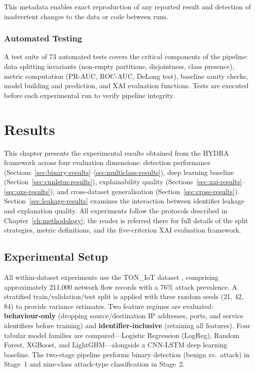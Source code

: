 \documentclass[12pt,a4paper]{report}
\begin{document}
This metadata enables exact reproduction of any reported result and detection of inadvertent changes to the data or code between runs.

\subsection{Automated Testing}
\label{sec:testing}

A test suite of 73 automated tests covers the critical components of the pipeline: data splitting invariants (non-empty partitions, disjointness, class presence), metric computation (PR-AUC, ROC-AUC, DeLong test), baseline sanity checks, model building and prediction, and XAI evaluation functions. Tests are executed before each experimental run to verify pipeline integrity.

\chapter{Results}
\label{ch:results}

This chapter presents the experimental results obtained from the HYDRA framework across four evaluation dimensions: detection performance (Sections~\ref{sec:binary-results}--\ref{sec:multiclass-results}), deep learning baseline (Section~\ref{sec:cnnlstm-results}), explainability quality (Sections~\ref{sec:xai-results}--\ref{sec:oxs-results}), and cross-dataset generalisation (Section~\ref{sec:cross-results}). Section~\ref{sec:leakage-results} examines the interaction between identifier leakage and explanation quality. All experiments follow the protocols described in Chapter~\ref{ch:methodology}; the reader is referred there for full details of the split strategies, metric definitions, and the five-criterion XAI evaluation framework.

\section{Experimental Setup}
\label{sec:setup}

All within-dataset experiments use the TON\_IoT dataset \citep{alsaedi2020}, comprising approximately 211,000 network flow records with a 76\% attack prevalence. A stratified train/validation/test split is applied with three random seeds (21, 42, 84) to provide variance estimates. Two feature regimes are evaluated: \textbf{behaviour-only} (dropping source/destination IP addresses, ports, and service identifiers before training) and \textbf{identifier-inclusive} (retaining all features). Four tabular model families are compared---Logistic Regression (LogReg), Random Forest, XGBoost, and LightGBM---alongside a CNN-LSTM deep learning baseline. The two-stage pipeline performs binary detection (benign vs.\ attack) in Stage~1 and nine-class attack-type classification in Stage~2.
\end{document}

